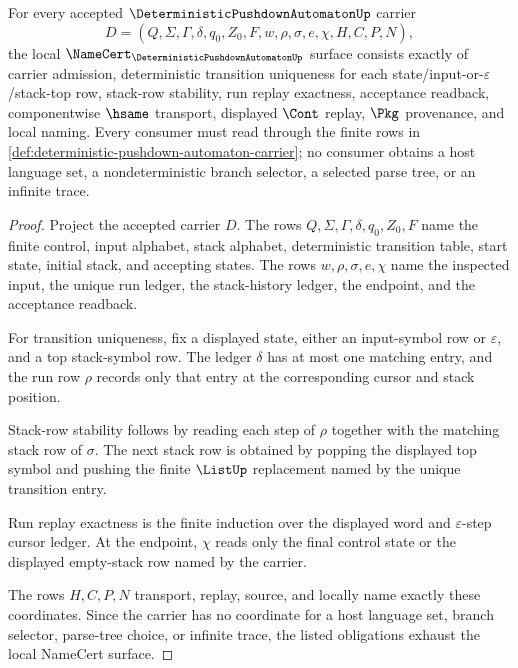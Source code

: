 \begin{theorem}
\label{thm:deterministic-pushdown-automaton-namecert-obligations}
For every accepted $\DeterministicPushdownAutomatonUp$ carrier
$$
D=(Q,\Sigma,\Gamma,\delta,q_0,Z_0,F,w,\rho,\sigma,e,\chi,H,C,P,N),
$$
the local $\NameCert_{\DeterministicPushdownAutomatonUp}$ surface consists
exactly of carrier admission, deterministic transition uniqueness for each
state/input-or-$\varepsilon$/stack-top row, stack-row stability, run replay
exactness, acceptance readback, componentwise $\hsame$ transport, displayed
$\Cont$ replay, $\Pkg$ provenance, and local naming. Every consumer must read
through the finite rows in
\autoref{def:deterministic-pushdown-automaton-carrier}; no consumer obtains a
host language set, a nondeterministic branch selector, a selected parse tree,
or an infinite trace.
\end{theorem}
\begin{proof}
Project the accepted carrier $D$. The rows $Q,\Sigma,\Gamma,\delta,q_0,Z_0,F$
name the finite control, input alphabet, stack alphabet, deterministic
transition table, start state, initial stack, and accepting states. The rows
$w,\rho,\sigma,e,\chi$ name the inspected input, the unique run ledger, the
stack-history ledger, the endpoint, and the acceptance readback.

For transition uniqueness, fix a displayed state, either an input-symbol row
or $\varepsilon$, and a top stack-symbol row. The ledger $\delta$ has at most
one matching entry, and the run row $\rho$ records only that entry at the
corresponding cursor and stack position.

Stack-row stability follows by reading each step of $\rho$ together with the
matching stack row of $\sigma$. The next stack row is obtained by popping the
displayed top symbol and pushing the finite $\ListUp$ replacement named by
the unique transition entry.

Run replay exactness is the finite induction over the displayed word and
$\varepsilon$-step cursor ledger. At the endpoint, $\chi$ reads only the final
control state or the displayed empty-stack row named by the carrier.

The rows $H,C,P,N$ transport, replay, source, and locally name exactly these
coordinates. Since the carrier has no coordinate for a host language set,
branch selector, parse-tree choice, or infinite trace, the listed obligations
exhaust the local NameCert surface.
\end{proof}

